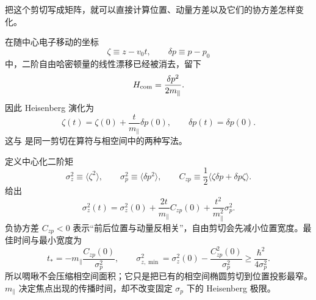 把这个剪切写成矩阵，就可以直接计算位置、动量方差以及它们的协方差怎样变化。

在随中心电子移动的坐标
\[
\zeta\equiv z-v_0t,
\qquad
\delta p\equiv p-p_0
\]
中，二阶自由哈密顿量的线性漂移已经被消去，留下
\[
H_{\rm com}=\frac{\delta p^2}{2m_\parallel}.
\]
因此 Heisenberg 演化为
\begin{equation}
\boxed{
\zeta(t)=\zeta(0)+\frac{t}{m_\parallel}\delta p(0),
\qquad
\delta p(t)=\delta p(0).}
\label{eq:electron-shear-heisenberg}
\end{equation}
这与 是同一剪切在算符与相空间中的两种写法。

定义中心化二阶矩
\[
\sigma_z^2\equiv\langle\zeta^2\rangle,
\qquad
\sigma_p^2\equiv\langle\delta p^2\rangle,
\qquad
C_{zp}\equiv\frac12\langle\zeta\delta p+\delta p\zeta\rangle.
\]
 给出
\begin{equation}
\boxed{
\sigma_z^2(t)
=\sigma_z^2(0)+\frac{2t}{m_\parallel}C_{zp}(0)
+\frac{t^2}{m_\parallel^2}\sigma_p^2.}
\label{eq:electron_shear_variance}
\end{equation}
负协方差 $C_{zp}<0$ 表示“前后位置与动量反相关”，自由剪切会先减小位置宽度。最佳时间与最小宽度为
\begin{equation}
\boxed{
 t_*=-m_\parallel\frac{C_{zp}(0)}{\sigma_p^2},
\qquad
\sigma_{z,\min}^2
=\sigma_z^2(0)-\frac{C_{zp}^2(0)}{\sigma_p^2}
\ge\frac{\hbar^2}{4\sigma_p^2}.}
\label{eq:electron_chirp_compression_bound}
\end{equation}
所以啁啾不会压缩相空间面积；它只是把已有的相空间椭圆剪切到位置投影最窄。$m_\parallel$ 决定焦点出现的传播时间，却不改变固定 $\sigma_p$ 下的 Heisenberg 极限。

